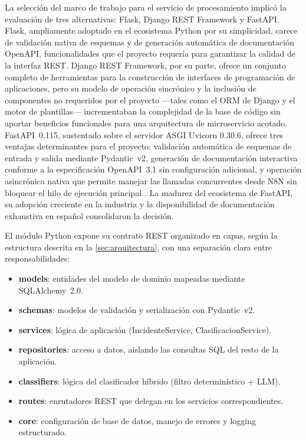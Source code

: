 La selección del marco de trabajo para el servicio de procesamiento implicó la evaluación de tres alternativas: Flask, Django REST Framework y FastAPI. Flask, ampliamente adoptado en el ecosistema Python por su simplicidad, carece de validación nativa de esquemas y de generación automática de documentación OpenAPI, funcionalidades que el proyecto requería para garantizar la calidad de la interfaz REST. Django REST Framework, por su parte, ofrece un conjunto completo de herramientas para la construcción de interfaces de programación de aplicaciones, pero su modelo de operación sincrónico y la inclusión de componentes no requeridos por el proyecto ---tales como el ORM de Django y el motor de plantillas--- incrementaban la complejidad de la base de código sin aportar beneficios funcionales para una arquitectura de microservicio acotado. FastAPI~0.115, sustentado sobre el servidor ASGI Uvicorn 0.30.6, ofrece tres ventajas determinantes para el proyecto: validación automática de esquemas de entrada y salida mediante Pydantic~v2, generación de documentación interactiva conforme a la especificación OpenAPI~3.1 sin configuración adicional, y operación asincrónica nativa que permite manejar las llamadas concurrentes desde N8N sin bloquear el hilo de ejecución principal \parencite{Tiangolo2024_fastapi}. La madurez del ecosistema de FastAPI, su adopción creciente en la industria y la disponibilidad de documentación exhaustiva en español consolidaron la decisión.

El módulo Python expone su contrato REST organizado en capas, según la estructura descrita en la \autoref{sec:arquitectura}, con una separación clara entre responsabilidades:

\begin{itemize}
  \item \textbf{models}: entidades del modelo de dominio mapeadas mediante SQLAlchemy~2.0.
  \item \textbf{schemas}: modelos de validación y serialización con Pydantic~v2.
  \item \textbf{services}: lógica de aplicación (IncidenteService, ClasificacionService).
  \item \textbf{repositories}: acceso a datos, aislando las consultas SQL del resto de la aplicación.
  \item \textbf{classifiers}: lógica del clasificador híbrido (filtro determinístico + LLM).
  \item \textbf{routes}: enrutadores REST que delegan en los servicios correspondientes.
  \item \textbf{core}: configuración de base de datos, manejo de errores y logging estructurado.
\end{itemize}

